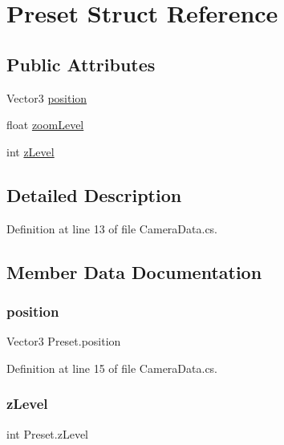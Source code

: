 \hypertarget{struct_preset}{}\section{Preset Struct Reference}
\label{struct_preset}
\subsection*{Public Attributes}
\begin{DoxyCompactItemize}
\item 
Vector3 \hyperlink{struct_preset_a84b9cfc188f0836e590d7304a7bc4a70}{position}
\item 
float \hyperlink{struct_preset_aff492ab19d9adb5babd2cb9f30b8d9d4}{zoom\+Level}
\item 
int \hyperlink{struct_preset_a42b7b1329e30409b76f209f0e9911b97}{z\+Level}
\end{DoxyCompactItemize}


\subsection{Detailed Description}


Definition at line 13 of file Camera\+Data.\+cs.



\subsection{Member Data Documentation}
\mbox{\label{struct_preset_a84b9cfc188f0836e590d7304a7bc4a70}} 
\subsubsection{\texorpdfstring{position}{position}}
{\footnotesize\ttfamily Vector3 Preset.\+position}



Definition at line 15 of file Camera\+Data.\+cs.

\mbox{\label{struct_preset_a42b7b1329e30409b76f209f0e9911b97}} 
\subsubsection{\texorpdfstring{z\+Level}{zLevel}}
{\footnotesize\ttfamily int Preset.\+z\+Level}



